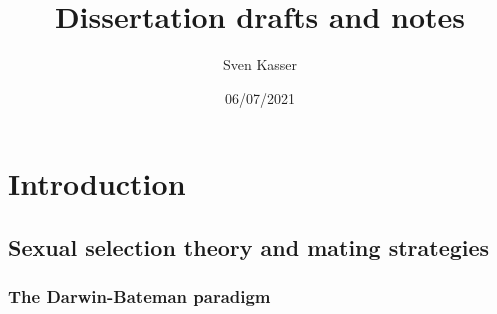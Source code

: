 \documentclass[
]{article}
\title{Dissertation drafts and notes}
\author{Sven Kasser}
\date{06/07/2021}
\begin{document}
\maketitle

\hypertarget{introduction}{%
\section{Introduction}\label{introduction}}

\hypertarget{sexual-selection-theory-and-mating-strategies}{%
\subsection{Sexual selection theory and mating
strategies}\label{sexual-selection-theory-and-mating-strategies}}

\hypertarget{the-darwin-bateman-paradigm}{%
\subsubsection{The Darwin-Bateman
paradigm}\label{the-darwin-bateman-paradigm}}
\end{document}
